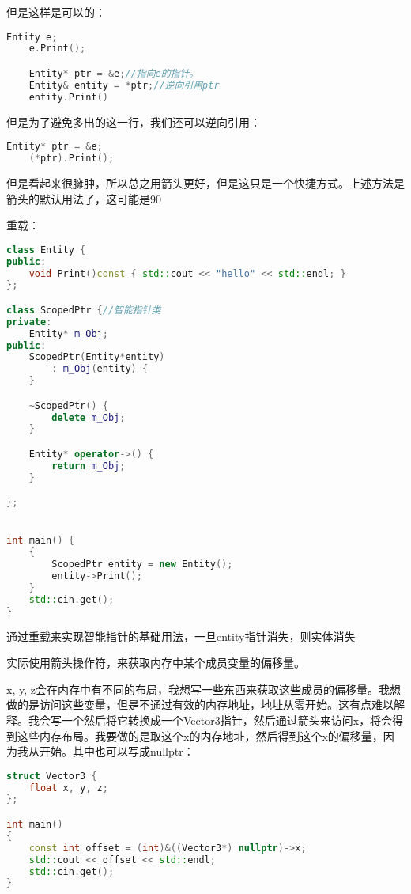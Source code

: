但是这样是可以的：

\begin{lstlisting}[language=c++]
    Entity e;
    e.Print();

    Entity* ptr = &e;//指向e的指针。
    Entity& entity = *ptr;//逆向引用ptr
    entity.Print()
\end{lstlisting}

但是为了避免多出的这一行，我们还可以逆向引用：

\begin{lstlisting}[language=c++]
    Entity* ptr = &e;
    (*ptr).Print();
\end{lstlisting}

但是看起来很臃肿，所以总之用箭头更好，但是这只是一个快捷方式。上述方法是箭头的默认用法了，这可能是90%

重载：

\begin{lstlisting}[language=c++]
class Entity {
public:
    void Print()const { std::cout << "hello" << std::endl; }
};

class ScopedPtr {//智能指针类
private:
    Entity* m_Obj;
public:
    ScopedPtr(Entity*entity)
        : m_Obj(entity) {
    }

    ~ScopedPtr() {
        delete m_Obj;
    }

    Entity* operator->() {
        return m_Obj;
    }

};


int main() {
    {
        ScopedPtr entity = new Entity();
        entity->Print();
    }
    std::cin.get();
}
\end{lstlisting}

通过重载来实现智能指针的基础用法，一旦{\ncodestyle entity}指针消失，则实体消失

实际使用箭头操作符，来获取内存中某个成员变量的偏移量。

{\ncodestyle x, y, z}会在内存中有不同的布局，我想写一些东西来获取这些成员的偏移量。我想做的是访问这些变量，但是不通过有效的内存地址，地址从零开始。这有点难以解释。我会写一个{}然后将它转换成一个{\ncodestyle Vector3}指针，然后通过箭头来访问{\ncodestyle x}，将会得到这些内存布局。我要做的是取这个{\ncodestyle x}的内存地址，然后得到这个{\ncodestyle x}的偏移量，因为我从{}开始。其中{}也可以写成{\ncodestyle nullptr}：

\begin{lstlisting}[language=c++]
struct Vector3 {
	float x, y, z;
};

int main()
{
	const int offset = (int)&((Vector3*) nullptr)->x;
	std::cout << offset << std::endl;
	std::cin.get();
}
\end{lstlisting}

